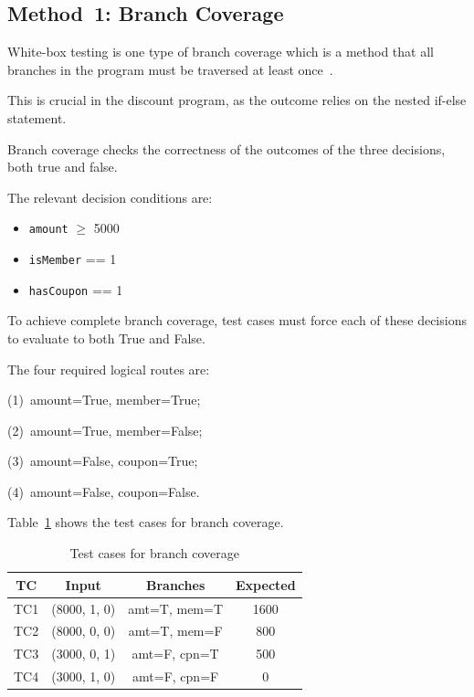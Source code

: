 \documentclass[conference]{IEEEtran}
\begin{document}
\subsection{Method~1: Branch Coverage}

White-box testing is one type of branch coverage which is a method that all branches in the program must be traversed at least once~\cite{nidhra2012}.

This is crucial in the discount program, as the outcome relies on the nested if-else statement.

Branch coverage checks the correctness of the outcomes of the three decisions, both true and false.



The relevant decision conditions are:

\begin{itemize}

\item \texttt{amount} $\geq$ 5000

\item \texttt{isMember} == 1

\item \texttt{hasCoupon} == 1

\end{itemize}



To achieve complete branch coverage, test cases must force each of these decisions to evaluate to both True and False.

The four required logical routes are:

(1)~amount=True, member=True;

(2)~amount=True, member=False;

(3)~amount=False, coupon=True;

(4)~amount=False, coupon=False.



Table~\ref{tab:branch_tc} shows the test cases for branch coverage.



\begin{table}[!t]

\centering

\caption{Test cases for branch coverage}

\label{tab:branch_tc}

\begin{tabular}{|c|c|c|c|}
\hline
\textbf{TC} & \textbf{Input} & \textbf{Branches} & \textbf{Expected} \\
\hline
TC1 & (8000, 1, 0) & amt=T, mem=T & 1600 \\
TC2 & (8000, 0, 0) & amt=T, mem=F & 800 \\
TC3 & (3000, 0, 1) & amt=F, cpn=T & 500 \\
TC4 & (3000, 1, 0) & amt=F, cpn=F & 0 \\
\hline
\end{tabular}

\end{table}
\end{document}
